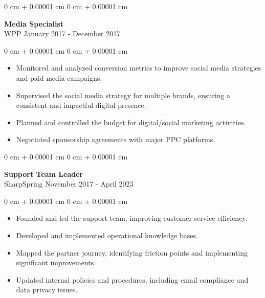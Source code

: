 \documentclass[10pt, letterpaper]{article}
\newenvironment{highlights}{
    \begin{itemize}[
        topsep=0.10 cm,
        parsep=0.10 cm,
        partopsep=0pt,
        itemsep=0pt,
        leftmargin=0 cm + 10pt
    ]
}{
    \end{itemize}
}
\newenvironment{onecolentry}{
    \begin{adjustwidth}{
        0 cm + 0.00001 cm
    }{
        0 cm + 0.00001 cm
    }
}{
    \end{adjustwidth}
}
\begin{document}
\vspace{0.2cm}

\begin{onecolentry}
    \setcolumnwidth{\fill, 4.5cm}
    \begin{paracol}{2}
        \textbf{Media Specialist} \\ WPP
        \switchcolumn
        \raggedleft January 2017 - December 2017
    \end{paracol}
\end{onecolentry}
\vspace{0.10cm}
\begin{onecolentry}
    \begin{highlights}
                \item Monitored and analyzed conversion metrics to improve social media strategies and paid media campaigns.
                \item Supervised the social media strategy for multiple brands, ensuring a consistent and impactful digital presence.
                \item Planned and controlled the budget for digital/social marketing activities.
                \item Negotiated sponsorship agreements with major PPC platforms.
    \end{highlights}
\end{onecolentry}

\vspace{0.2cm}

\begin{onecolentry}
    \setcolumnwidth{\fill, 4.5cm}
    \begin{paracol}{2}
        \textbf{Support Team Leader} \\ SharpSpring
        \switchcolumn
        \raggedleft November 2017 - April 2023
    \end{paracol}
\end{onecolentry}
\vspace{0.10cm}
\begin{onecolentry}
    \begin{highlights}
                \item Founded and led the support team, improving customer service efficiency.
                \item Developed and implemented operational knowledge bases.
                \item Mapped the partner journey, identifying friction points and implementing significant improvements.
                \item Updated internal policies and procedures, including email compliance and data privacy issues.
    \end{highlights}
\end{onecolentry}
\end{document}
